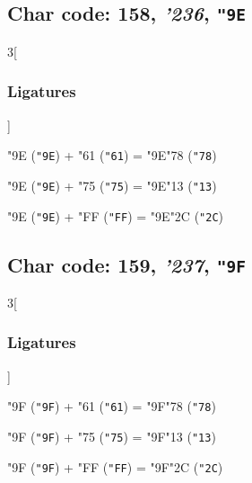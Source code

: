 \documentclass{article}
\newlength{\maxcharwidth}
\begin{document}
\subsection{Char code: 158, {\it'236}, {\tt"9E}}
\label{char_158}


\begin{multicols}{3}[\subsubsection{Ligatures}]

{\testfont\char"9E\noboundary} ({\tt"9E}) + {\testfont\char"61\noboundary} ({\tt"61}) = {\testfont\char"9E\noboundary}{\testfont\char"78\noboundary} ({\tt"78}) 

{\testfont\char"9E\noboundary} ({\tt"9E}) + {\testfont\char"75\noboundary} ({\tt"75}) = {\testfont\char"9E\noboundary}{\testfont\char"13\noboundary} ({\tt"13}) 

{\testfont\char"9E\noboundary} ({\tt"9E}) + {\testfont\char"FF\noboundary} ({\tt"FF}) = {\testfont\char"9E\noboundary}{\testfont\char"2C\noboundary} ({\tt"2C}) 

\end{multicols}

\subsection{Char code: 159, {\it'237}, {\tt"9F}}
\label{char_159}


\begin{multicols}{3}[\subsubsection{Ligatures}]

{\testfont\char"9F\noboundary} ({\tt"9F}) + {\testfont\char"61\noboundary} ({\tt"61}) = {\testfont\char"9F\noboundary}{\testfont\char"78\noboundary} ({\tt"78}) 

{\testfont\char"9F\noboundary} ({\tt"9F}) + {\testfont\char"75\noboundary} ({\tt"75}) = {\testfont\char"9F\noboundary}{\testfont\char"13\noboundary} ({\tt"13}) 

{\testfont\char"9F\noboundary} ({\tt"9F}) + {\testfont\char"FF\noboundary} ({\tt"FF}) = {\testfont\char"9F\noboundary}{\testfont\char"2C\noboundary} ({\tt"2C}) 

\end{multicols}
\end{document}
